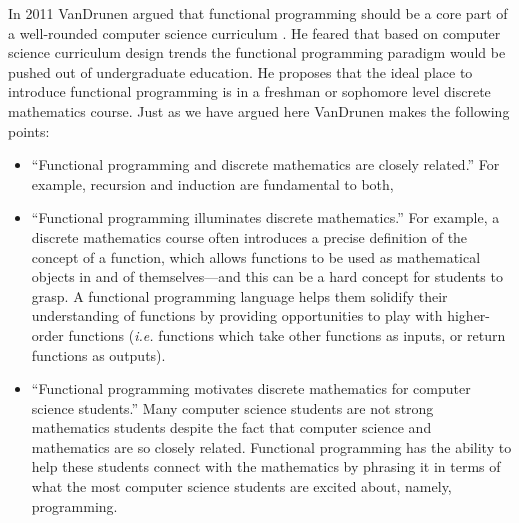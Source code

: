 In 2011 VanDrunen argued that functional programming should be a core
part of a well-rounded computer science curriculum
\citep{VanDrunen:2011}.  He feared that based on computer science
curriculum design trends the functional programming paradigm would be
pushed out of undergraduate education. He proposes that the ideal
place to introduce functional programming is in a freshman or
sophomore level discrete mathematics course.  Just as we have argued
here VanDrunen makes the following points:
\begin{itemize}
\item ``Functional programming and discrete mathematics are closely
  related.''  For example, recursion and induction are fundamental to
  both,
\item ``Functional programming illuminates discrete mathematics.'' For
  example, a discrete mathematics course often introduces a precise
  definition of the concept of a function, which allows functions to
  be used as mathematical objects in and of themselves---and this can
  be a hard concept for students to grasp.  A functional programming
  language helps them solidify their understanding of functions by
  providing opportunities to play with higher-order functions
  (\emph{i.e.} functions which take other functions as inputs, or
  return functions as outputs).
\item ``Functional programming motivates discrete mathematics for
  computer science students.'' Many computer science students are not
  strong mathematics students despite the fact that computer science
  and mathematics are so closely related.  Functional programming has
  the ability to help these students connect with the mathematics by
  phrasing it in terms of what the most computer science students are
  excited about, namely, programming.
\end{itemize}
